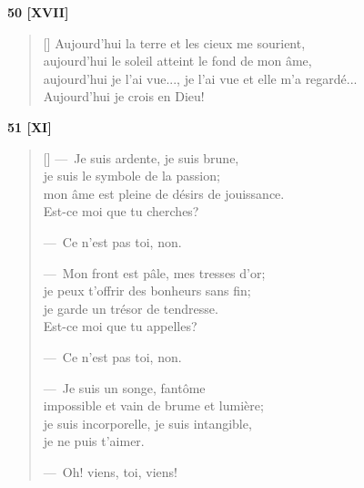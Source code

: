 \documentclass[a4paper,12pt]{book}
\begin{document}
\bigskip

\begin{center}
  \textbf{50 [XVII]}
\end{center}

\settowidth{\versewidth}{aujourd'hui je l'ai vue..., je l'ai vue et elle m'a regardé}

\begin{verse}[\versewidth]
  Aujourd'hui la terre et les cieux me sourient, \\
  aujourd'hui le soleil atteint le fond de mon âme, \\
  aujourd'hui je l'ai vue..., je l'ai vue et elle m'a regardé... \\
  Aujourd'hui je crois en Dieu!
\end{verse}

\bigskip

\begin{center}
  \textbf{51 [XI]}
\end{center}

\settowidth{\versewidth}{de désirs de jouissance mon âme est pleine.}

\begin{verse}[\versewidth]
  ---~Je suis ardente, je suis brune, \\
  je suis le symbole de la passion; \\
  mon âme est pleine de désirs de jouissance. \\
  Est-ce moi que tu cherches?

  ---~Ce n'est pas toi, non.

  ---~Mon front est pâle, mes tresses d'or; \\
  je peux t'offrir des bonheurs sans fin; \\
  je garde un trésor de tendresse. \\
  Est-ce moi que tu appelles?

  ---~Ce n'est pas toi, non.

  ---~Je suis un songe, fantôme \\
  impossible et vain de brume et lumière; \\
  je suis incorporelle, je suis intangible, \\
  je ne puis t'aimer.

  ---~Oh! viens, toi, viens!
\end{verse}
\end{document}
